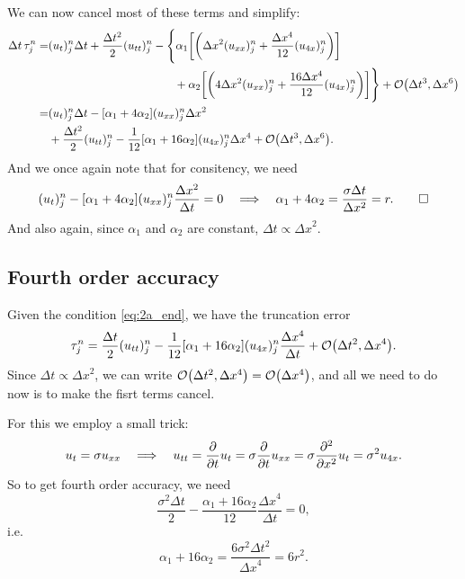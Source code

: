 \documentclass[11pt,letter, swedish, english
]{article}
\newcommand{\Dx}{\ensuremath{\Delta{x}}}
\newcommand{\Dt}{\ensuremath{\Delta{t}}}
\begin{document}
We can now cancel most of these terms and simplify:
\begin{equation}
\begin{aligned}
\Dt\,\tau_j^n=& (u_t)_j^n\Dt+\frac{\Dt^2}{2}(u_{tt})_j^n
-\Bigg\{\alpha_1\qty[
\qty(\Dx^2(u_{xx})_j^n+\frac{\Dx^4}{12}(u_{4x})_j^n)]
\\ &\hspace{110pt}
+\alpha_2\qty[
\qty(4\Dx^2(u_{xx})_j^n+\frac{16\Dx^4}{12}(u_{4x})_j^n)]
\Bigg\} +\order{\Dt^3, \Dx^6}\\
=& (u_t)_j^n\Dt -[\alpha_1+4\alpha_2](u_{xx})_j^n\Dx^2\\
&+\frac{\Dt^2}{2}(u_{tt})_j^n-\frac{1}{12}[\alpha_1+16\alpha_2](u_{4x})_j^n\Dx^4
+\order{\Dt^3, \Dx^6}.
\end{aligned}
\end{equation}
And we once again note that for consitency, we need 
\begin{equation}\label{eq:2a_end}
(u_t)_j^n-[\alpha_1+4\alpha_2](u_{xx})_j^n\frac{\Dx^2}{\Dt}=0
\quad\Longrightarrow\quad
\alpha_1+4\alpha_2=\frac{\sigma\Dt}{\Dx^2}=r.
\qed
\end{equation}
And also again, since $\alpha_1$ and $\alpha_2$ are constant,
$\Dt\propto\Dx^2$. 

\subsection{Fourth order accuracy}

Given the condition \eqref{eq:2a_end}, we have the truncation error
\begin{equation}
\tau_j^n=\frac{\Dt}{2}(u_{tt})_j^n
-\frac{1}{12}[\alpha_1+16\alpha_2](u_{4x})_j^n\frac{\Dx^4}{\Dt}
+\order{\Dt^2, \Dx^4}.
\end{equation}
Since $\Dt\propto\Dx^2$, we can write $\order{\Dt^2,
  \Dx^4}=\order{\Dx^4}$, and all we need to do now is to make the
fisrt terms cancel.

For this we employ a small trick:
\begin{equation}
u_t=\sigma u_{xx}
\quad\Longrightarrow\quad
u_{tt}=\pdv{t}u_t=\sigma\pdv{t}u_{xx}
=\sigma\pdv[2]{x}u_t=\sigma^2u_{4x}.
\end{equation}
So to get fourth order accuracy, we need
\begin{equation}
\frac{\sigma^2\Dt}{2}-\frac{\alpha_1+16\alpha_2}{12}\frac{\Dx^4}{\Dt}=0,
\end{equation}
i.e.
\begin{equation}
\alpha_1+16\alpha_2=\frac{6\sigma^2\Dt^2}{\Dx^4}=6r^2.
\end{equation}
\end{document}
